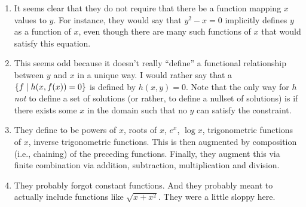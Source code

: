 \documentclass[11pt, oneside]{amsart}
\begin{document}
\begin{enumerate}
  \item It seems clear that they do not require that there be a
   function mapping $x$ values to $y$. For instance, they
  would say that $y^2 - x = 0$ implicitly defines $y$ as a function of
  $x$, even though there are many such functions of $x$ that would
  satisfy this equation.

  \item This seems odd because it doesn't really ``define'' a functional
  relationship between $y$ and $x$ in a unique way. I would rather say
  that a  $\left\{ f \mid h(x, f(x)) = 0 \right\}$ is
  defined by $h(x, y) = 0$. Note that the only way for $h$ \emph{not} to
  define a set of solutions (or rather, to define a nullset of
  solutions) is if there exists some $x$ in the domain such that no $y$
  can satisfy the constraint.

  \item They define  to be powers of $x$,
  roots of $x$, $e^x$, $\log x$, trigonometric functions of $x$, inverse
  trigonometric functions. This is then augmented by composition (i.e.,
  chaining) of the preceding functions. Finally, they augment this via
  finite combination via addition, subtraction, multiplication and
  division.

  \item They probably forgot constant functions. And they probably meant
  to actually include functions like $\sqrt{x + x^2}$. They were a
  little sloppy here.
\end{enumerate}
\end{document}
